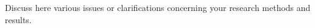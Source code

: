 \documentclass[main.tex]{subfiles}
\begin{document}
	Discuss here various issues or clarifications concerning your research
	methods and results.
\end{document}
